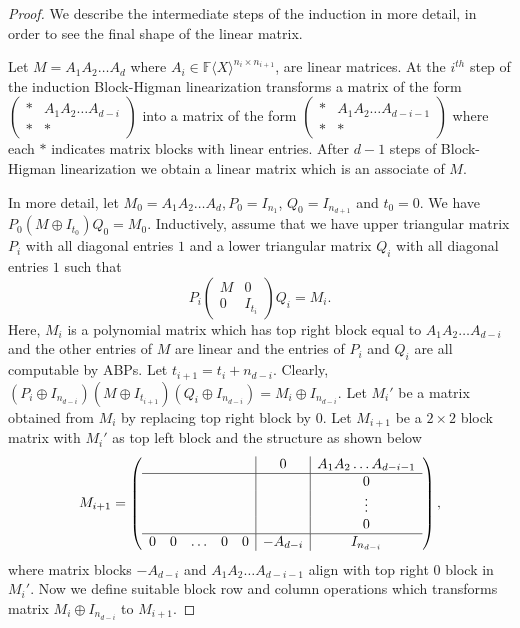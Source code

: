 \documentclass[10pt,a4paper]{article}
\newcommand{\F}{\mathbb{F}}
\renewcommand{\angle}[1]{\langle #1 \rangle}
\newcommand{\FX}{\F\angle{X}}
\newcommand{\fR}{\FX}
\begin{document}
\begin{proof}
We describe the intermediate steps of the induction in more detail, in
order to see the final shape of the linear matrix.

Let $M= A_1A_2\ldots A_d$ where $A_i \in \fR ^{n_i \times n_{i+1}}$,
are linear matrices. At the $i^{th}$ step of the induction
Block-Higman linearization transforms a matrix of the form $\left(
\begin{array}{cc}
* & A_1A_2\ldots A_{d-i} \\
%
* & *
\end{array} 
\right)$ into a matrix of the form $\left(
\begin{array}{cc}
* & A_1A_2\ldots A_{d-i-1} \\
%
* & *
\end{array} 
\right)$ 
where each $*$ indicates matrix blocks with linear entries. After
$d-1$ steps of Block-Higman linearization we obtain a linear matrix
which is an associate of $M$. 

In more detail, let $M_0=A_1A_2\ldots A_d, P_0=I_{n_1}$,
$Q_0=I_{n_{d+1}}$ and $t_0=0$. We have
$P_0 (M \oplus I_{t_0}) Q_0 = M_0$. Inductively, assume that we have
upper triangular matrix $P_i$ with all diagonal entries $1$ and a
lower triangular matrix $Q_i$ with all diagonal entries $1$ such that
\[ P_i \left(
\begin{array}{cc}
M & 0 \\
%
0 & I_{t_i}
\end{array} 
\right)Q_i = M_i.
\] 
Here, $M_i$ is a polynomial matrix which has top right block equal to
$A_1A_2 \ldots A_{d-i}$ and the other entries of $M$ are linear and
the entries of $P_i$ and $Q_i$ are all computable by ABPs. Let
$t_{i+1}=t_i + n_{d-i}$. Clearly,
$(P_i \oplus I_{n_{d-i}}) (M \oplus I_{t_{i+1}})(Q_i \oplus
I_{n_{d-i}})= M_i \oplus I_{n_{d-i}}$. Let $M_i'$ be a matrix obtained
from $M_i$ by replacing top right block by $0$. Let $M_{i+1}$ be a
$2\times 2$ block matrix with $M_i'$ as top left block and the
structure as shown below
\[
M_{i+1}= \left(
\begin{array}{ccccc|c|c}
 &&&&& 0& A_1A_2\ldots A_{d-i-1} \\
\hline
%
&&&&& & 0\\
&&&&& & \vdots\\
&&&&& & 0\\
%
\hline
0& 0& \ldots & 0 & 0& -A_{d-i} & I_{n_{d-i}}
\end{array} 
\right),
\]
where matrix blocks $-A_{d-i}$ and $A_1A_2\ldots A_{d-i-1}$ align with top right $0$ block in $M_i'$. Now we define suitable block row and column operations which transforms matrix $M_i \oplus I_{n_{d-i}}$ to $M_{i+1}$. 


\end{proof}
\end{document}
